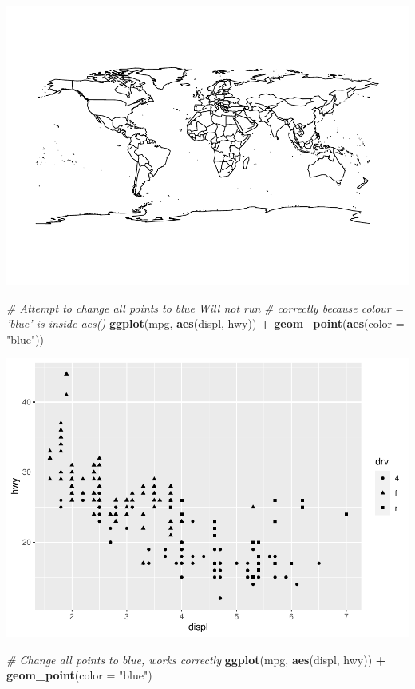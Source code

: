 \documentclass[
]{book}
\newenvironment{Shaded}{\begin{snugshade}}{\end{snugshade}}
\newcommand{\CommentTok}[1]{\textcolor[rgb]{0.56,0.35,0.01}{\textit{#1}}}
\newcommand{\DataTypeTok}[1]{\textcolor[rgb]{0.13,0.29,0.53}{#1}}
\newcommand{\KeywordTok}[1]{\textcolor[rgb]{0.13,0.29,0.53}{\textbf{#1}}}
\newcommand{\NormalTok}[1]{#1}
\newcommand{\OperatorTok}[1]{\textcolor[rgb]{0.81,0.36,0.00}{\textbf{#1}}}
\newcommand{\StringTok}[1]{\textcolor[rgb]{0.31,0.60,0.02}{#1}}
\begin{document}
\includegraphics{_main_files/figure-latex/unnamed-chunk-255-1.pdf}

\begin{Shaded}
\begin{Highlighting}[]
\CommentTok{# Attempt to change all points to blue Will not run}
\CommentTok{# correctly because colour = 'blue' is inside aes()}
\KeywordTok{ggplot}\NormalTok{(mpg, }\KeywordTok{aes}\NormalTok{(displ, hwy)) }\OperatorTok{+}\StringTok{ }\KeywordTok{geom_point}\NormalTok{(}\KeywordTok{aes}\NormalTok{(}\DataTypeTok{color =} \StringTok{"blue"}\NormalTok{))}
\end{Highlighting}
\end{Shaded}

\includegraphics{_main_files/figure-latex/unnamed-chunk-255-2.pdf}

\begin{Shaded}
\begin{Highlighting}[]
\CommentTok{# Change all points to blue, works correctly}
\KeywordTok{ggplot}\NormalTok{(mpg, }\KeywordTok{aes}\NormalTok{(displ, hwy)) }\OperatorTok{+}\StringTok{ }\KeywordTok{geom_point}\NormalTok{(}\DataTypeTok{color =} \StringTok{"blue"}\NormalTok{)}
\end{Highlighting}
\end{Shaded}
\end{document}
